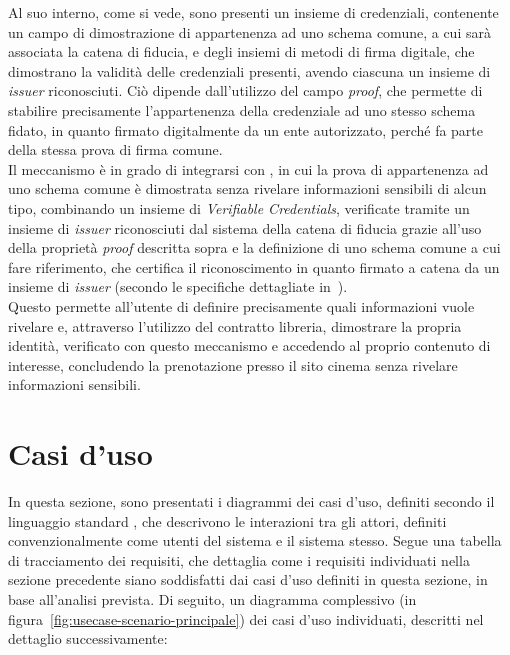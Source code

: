 Al suo interno, come si vede, sono presenti un insieme di credenziali, contenente un campo di dimostrazione di appartenenza ad uno schema comune,
a cui sarà associata la catena di fiducia, e degli insiemi di metodi di firma digitale, che dimostrano la validità delle credenziali presenti,
avendo ciascuna un insieme di \textit{issuer} riconosciuti. Ciò dipende dall'utilizzo del campo \textit{proof}, che permette di stabilire precisamente
l'appartenenza della credenziale ad uno stesso schema fidato, in quanto firmato digitalmente da un ente autorizzato, perché fa parte della stessa prova di firma 
comune. \\

Il meccanismo è in grado di integrarsi con , in cui la prova di appartenenza ad uno schema comune è dimostrata
senza rivelare informazioni sensibili di alcun tipo, combinando un insieme di \textit{Verifiable Credentials}, verificate tramite 
un insieme di \textit{issuer} riconosciuti dal sistema della catena di fiducia grazie all'uso della proprietà \textit{proof} descritta sopra
e la definizione di uno schema comune a cui fare riferimento, che certifica il riconoscimento in quanto firmato a catena da un insieme di \textit{issuer}
(secondo le specifiche dettagliate in~\cite{site:zkpw3c}). \\
Questo permette all'utente di definire precisamente quali informazioni vuole rivelare e, attraverso l'utilizzo del contratto libreria, 
dimostrare la propria identità, verificato con questo meccanismo e accedendo al proprio contenuto di interesse, concludendo la prenotazione 
presso il sito cinema senza rivelare informazioni sensibili. 

\section{Casi d'uso}\label{sec:usecase}

In questa sezione, sono presentati i diagrammi dei casi d'uso, definiti secondo il linguaggio standard ,
che descrivono le interazioni tra gli attori, definiti convenzionalmente come utenti del sistema e il sistema stesso. 
Segue una tabella di tracciamento dei requisiti, che dettaglia come i requisiti individuati nella sezione precedente siano soddisfatti
dai casi d'uso definiti in questa sezione, in base all'analisi prevista. 
Di seguito, un diagramma complessivo (in figura~\ref{fig:usecase-scenario-principale}) dei casi d'uso individuati, descritti nel dettaglio successivamente: \\

